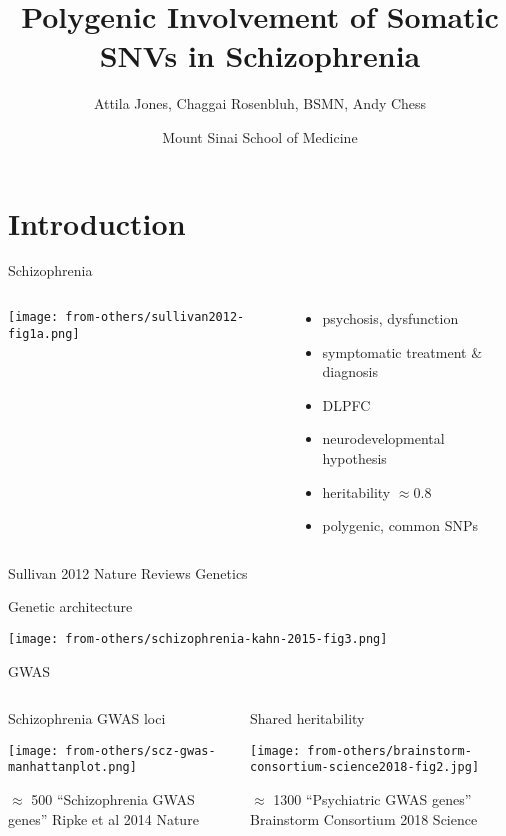\documentclass[usenames,dvipsnames]{beamer}
\title{Polygenic Involvement of Somatic SNVs in Schizophrenia}
\author{Attila Jones, Chaggai Rosenbluh, BSMN, Andy Chess}
\date{Mount Sinai School of Medicine}
\begin{document}
\maketitle

\section{Introduction}

\begin{frame}{Schizophrenia}
\begin{columns}[t]
\begin{column}{0.4\textwidth}

\texttt{[image: from-others/sullivan2012-fig1a.png]}
\end{column}

\begin{column}{0.6\textwidth}
\begin{itemize}
\item psychosis, dysfunction
\item symptomatic treatment \& diagnosis
\item DLPFC
\item neurodevelopmental hypothesis
\item heritability \(\approx 0.8\)
\item polygenic, common SNPs
\end{itemize}
\end{column}
\end{columns}

{\tiny Sullivan 2012 Nature Reviews Genetics}
\end{frame}

\begin{frame}{Genetic architecture}
\begin{center}
\texttt{[image: from-others/schizophrenia-kahn-2015-fig3.png]}
\end{center}
\end{frame}

\begin{frame}[label=gwas]{GWAS}

\begin{columns}[t]
\begin{column}{0.5\textwidth}
\begin{center}
Schizophrenia GWAS loci

\texttt{[image: from-others/scz-gwas-manhattanplot.png]}

\footnotesize
\(\approx\) 500 ``Schizophrenia GWAS genes''
{\tiny Ripke et al 2014 Nature}
\end{center}
\end{column}

\begin{column}{0.5\textwidth}
Shared heritability

\texttt{[image: from-others/brainstorm-consortium-science2018-fig2.jpg]}

\footnotesize
\(\approx\) 1300 ``Psychiatric GWAS genes''
{\tiny Brainstorm Consortium 2018 Science}
\end{column}
\end{columns}
\end{frame}
\end{document}
